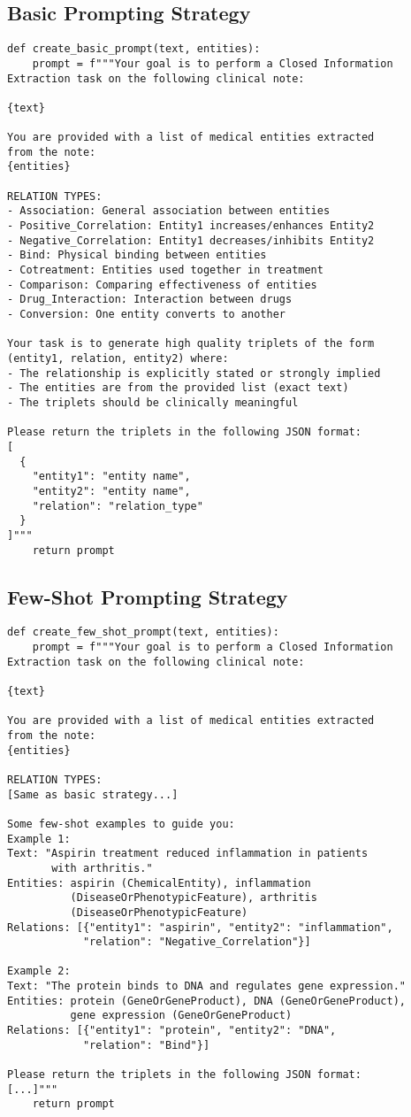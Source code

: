 \subsection{Basic Prompting Strategy}
\begin{verbatim}
def create_basic_prompt(text, entities):
    prompt = f"""Your goal is to perform a Closed Information 
Extraction task on the following clinical note:

{text}

You are provided with a list of medical entities extracted 
from the note:
{entities}

RELATION TYPES:
- Association: General association between entities
- Positive_Correlation: Entity1 increases/enhances Entity2
- Negative_Correlation: Entity1 decreases/inhibits Entity2
- Bind: Physical binding between entities
- Cotreatment: Entities used together in treatment
- Comparison: Comparing effectiveness of entities
- Drug_Interaction: Interaction between drugs
- Conversion: One entity converts to another

Your task is to generate high quality triplets of the form 
(entity1, relation, entity2) where:
- The relationship is explicitly stated or strongly implied
- The entities are from the provided list (exact text)
- The triplets should be clinically meaningful

Please return the triplets in the following JSON format:
[
  {
    "entity1": "entity name",
    "entity2": "entity name",
    "relation": "relation_type"
  }
]"""
    return prompt
\end{verbatim}

\subsection{Few-Shot Prompting Strategy}
\begin{verbatim}
def create_few_shot_prompt(text, entities):
    prompt = f"""Your goal is to perform a Closed Information 
Extraction task on the following clinical note:

{text}

You are provided with a list of medical entities extracted 
from the note:
{entities}

RELATION TYPES:
[Same as basic strategy...]

Some few-shot examples to guide you:
Example 1:
Text: "Aspirin treatment reduced inflammation in patients 
       with arthritis."
Entities: aspirin (ChemicalEntity), inflammation 
          (DiseaseOrPhenotypicFeature), arthritis 
          (DiseaseOrPhenotypicFeature)
Relations: [{"entity1": "aspirin", "entity2": "inflammation", 
            "relation": "Negative_Correlation"}]

Example 2:
Text: "The protein binds to DNA and regulates gene expression."
Entities: protein (GeneOrGeneProduct), DNA (GeneOrGeneProduct), 
          gene expression (GeneOrGeneProduct)
Relations: [{"entity1": "protein", "entity2": "DNA", 
            "relation": "Bind"}]

Please return the triplets in the following JSON format:
[...]"""
    return prompt
\end{verbatim}


